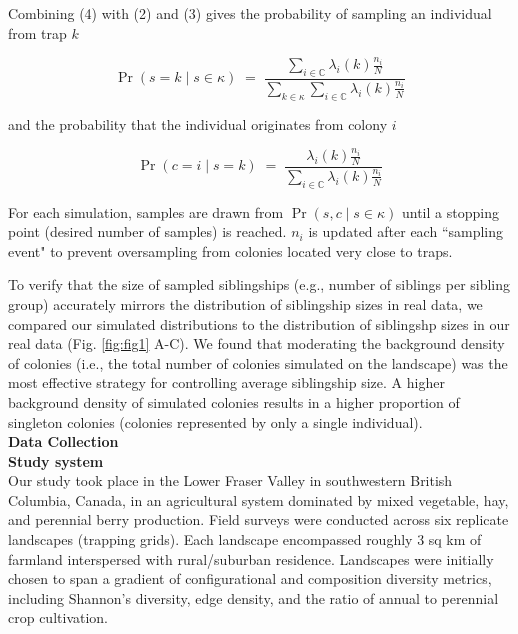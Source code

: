 \documentclass[11pt]{article}
\begin{document}
Combining (4) with (2) and (3) gives the probability of sampling an individual from trap $k$

\[
\Pr(s = k \mid s \in \kappa) \;=\; \frac{\sum_{i \in \mathbb{C}} \lambda_i(k) \frac{n_i}{N}}{\sum_{k \in \kappa} \sum_{i \in \mathbb{C}} \lambda_i(k) \frac{n_i}{N}}
\]

and the probability that the individual originates from colony $i$

\[
\Pr(c = i \mid s = k) \;=\; \frac{\lambda_i(k) \frac{n_i}{N}}{\sum_{i \in \mathbb{C}} \lambda_i(k) \frac{n_i}{N}}
\]

For each simulation, samples are drawn from $\Pr(s, c \mid s \in \kappa)$ until a stopping point (desired number of samples) is reached. $n_i$ is updated after each ``sampling event" to prevent oversampling from colonies located very close to traps.

To verify that the size of sampled siblingships (e.g., number of siblings per sibling group) accurately mirrors the distribution of siblingship sizes in real data, we compared our simulated distributions to the distribution of siblingshp sizes in our real data (Fig. \ref{fig:fig1} A-C).
We found that moderating the background density of colonies (i.e., the total number of colonies simulated on the landscape) was the most effective strategy for controlling average siblingship size. A higher background density of simulated colonies results in a higher proportion of singleton colonies (colonies represented by only a single individual). \\



\noindent \textbf{Data Collection} \\

\noindent \textbf{Study system} \\
Our study took place in the Lower Fraser Valley in southwestern British Columbia, Canada, in an agricultural system dominated by mixed vegetable, hay, and perennial berry production. Field surveys were conducted across six replicate landscapes (trapping grids). Each landscape encompassed roughly 3 sq km of farmland interspersed with rural/suburban residence. Landscapes were initially chosen to span a gradient of configurational and composition diversity metrics, including Shannon's diversity, edge density, and the ratio of annual to perennial crop cultivation. \\
\end{document}
